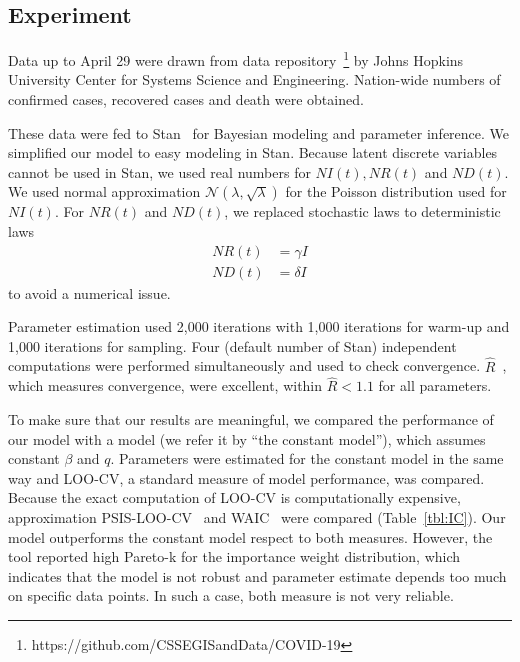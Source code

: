 \documentclass{amsart}
\begin{document}


\subsection{Experiment}

Data up to April 29 were drawn from data repository~\footnote{https://github.com/CSSEGISandData/COVID-19} by Johns Hopkins University Center for Systems Science and Engineering.
Nation-wide numbers of confirmed cases, recovered cases and death were obtained.

These data were fed to Stan~\cite{carpenter2017stan} for Bayesian modeling and parameter inference.
We simplified our model to easy modeling in Stan.
Because latent discrete variables cannot be used in Stan, we used real numbers for $NI(t), NR(t)$ and $ND(t)$.
We used normal approximation $\mathcal{N}(\lambda, \sqrt{\lambda})$ for the Poisson distribution used for $NI(t)$.
For $NR(t)$ and $ND(t)$, we replaced stochastic laws to deterministic laws
\begin{align}
 NR(t) &= \gamma I\\
 ND(t) &= \delta I
\end{align}
to avoid a numerical issue.

Parameter estimation used 2,000 iterations with 1,000 iterations for warm-up and 1,000 iterations for sampling.
Four (default number of Stan) independent computations were performed simultaneously and used to check convergence.
$\hat{R}$~\cite{vehtari2019rank}, which measures convergence, were excellent, within $\hat{R} < 1.1$ for all parameters. 

To make sure that our results are meaningful, we compared the performance of our model with a model (we refer it by ``the constant model''), which assumes constant $\beta$ and $q$.
Parameters were estimated for the constant model in the same way and LOO-CV, a standard measure of model performance, was compared.
Because the exact computation of LOO-CV is computationally expensive, approximation PSIS-LOO-CV~\cite{Vehtari2017} and WAIC~\cite{watanabe2010asymptotic} were compared (Table~\ref{tbl:IC}).
Our model outperforms the constant model respect to both measures.
However, the tool reported high Pareto-k for the importance weight distribution, which indicates that the model is not robust and parameter estimate depends too much on specific data points.
In such a case, both measure is not very reliable.
\end{document}
